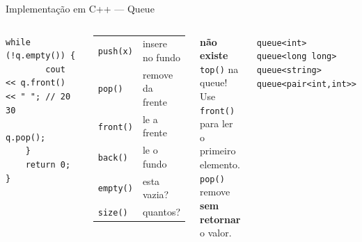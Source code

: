 \documentclass[aspectratio=169,10pt]{beamer}
\begin{document}
\begin{frame}[fragile,shrink=3]{Implementação em C++ --- Queue}
\begin{columns}[t]
\begin{tcolorbox}[caixaCodigo]
\begin{lstlisting}[style=cppstyle]
    while (!q.empty()) {
        cout << q.front() << " "; // 20 30
        q.pop();
    }
    return 0;
}
        \end{lstlisting}
      \end{tcolorbox}
      \begin{tcolorbox}[caixaAzul,title={Resumo STL}]
        \footnotesize
        \begin{tabular}{@{}ll@{}}
          \texttt{push(x)}  & insere no fundo\\[2pt]
          \texttt{pop()}    & remove da frente\\[2pt]
          \texttt{front()}  & le a frente\\[2pt]
          \texttt{back()}   & le o fundo\\[2pt]
          \texttt{empty()}  & esta vazia?\\[2pt]
          \texttt{size()}   & quantos?\\
        \end{tabular}
      \end{tcolorbox}
      \vspace{0.1cm}
      \begin{tcolorbox}[caixaVermelho,title={Atenção}]
        \footnotesize
        \textbf{não existe} \texttt{top()} na queue!\\[2pt]
        Use \texttt{front()} para ler\\
        o primeiro elemento.\\[2pt]
        \texttt{pop()} remove\\
        \textbf{sem retornar} o valor.
      \end{tcolorbox}
      \vspace{0.1cm}
      \begin{tcolorbox}[caixaVerde,title={Tipos possiveis}]
        \footnotesize
        \texttt{queue<int>}\\
        \texttt{queue<long long>}\\
        \texttt{queue<string>}\\
        \texttt{queue<pair<int,int>>}
      \end{tcolorbox}
  \end{columns}
\end{frame}
\end{document}

